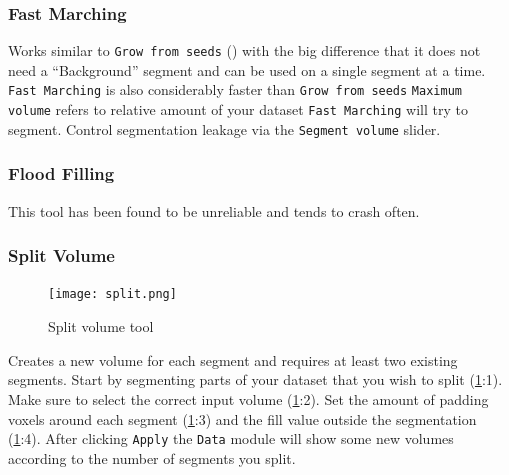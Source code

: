 \pagebreak
\subsubsection{Fast Marching}
Works similar to \texttt{Grow from seeds} () with the big difference that it does not need a ``Background'' segment and can be used on a single segment at a time.
\texttt{Fast Marching} is also considerably faster than \texttt{Grow from seeds}
\texttt{Maximum volume} refers to relative amount of your dataset \texttt{Fast Marching} will try to segment.
Control segmentation leakage via the \texttt{Segment volume} slider.

\pagebreak
\subsubsection{Flood Filling}
\cite{lassoSlicerSegmentEditorExtraEffects2024}
This tool has been found to be unreliable and tends to crash often.

\pagebreak
\subsubsection{Split Volume}
\begin{figure}[h!]
	\centerline{
		\texttt{[image: split.png]}}
	\caption{Split volume tool}\label{fig:split}
\end{figure}
\noindent
Creates a new volume for each segment and requires at least two existing segments.
Start by segmenting parts of your dataset that you wish to split (\cref{fig:split}:1).
Make sure to select the correct input volume (\cref{fig:split}:2).
Set the amount of padding voxels around each segment (\cref{fig:split}:3) and the fill value outside the segmentation (\cref{fig:split}:4).
After clicking \texttt{Apply} the \texttt{Data} module will show some new volumes according to the number of segments you split.

\pagebreak
